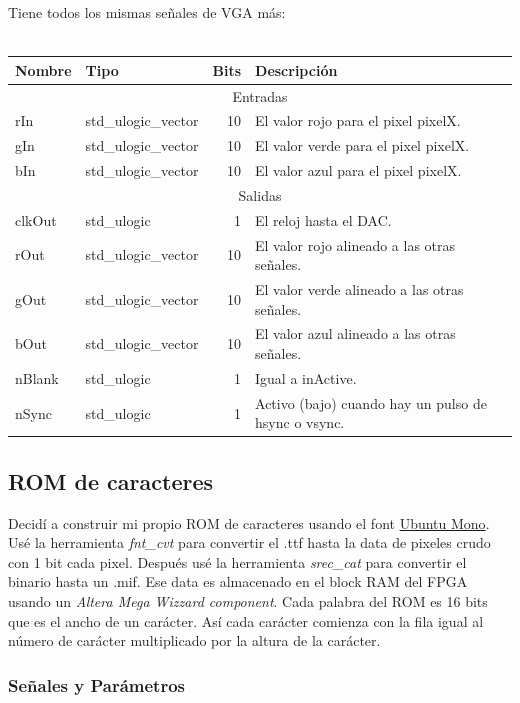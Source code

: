 \documentclass[a4paper]{article}
\begin{document}
Tiene todos los mismas señales de VGA más:\\ \\
\begin{tabular}{| l | l | r | p{8cm} |}
\hline
\textbf{Nombre} & \textbf{Tipo} & \textbf{Bits} & \textbf{Descripción} \\ \hline
\multicolumn{4}{|c|}{Entradas} \\ \hline
rIn & std\_ulogic\_vector & 10 & El valor rojo para el pixel pixelX. \\ 
gIn & std\_ulogic\_vector & 10 & El valor verde para el pixel pixelX. \\ 
bIn & std\_ulogic\_vector & 10 & El valor azul para el pixel pixelX. \\ 
\hline
\multicolumn{4}{|c|}{Salidas} \\ \hline
clkOut & std\_ulogic & 1 & El reloj hasta el DAC. \\
rOut & std\_ulogic\_vector & 10 & El valor rojo alineado a las otras señales. \\ 
gOut & std\_ulogic\_vector & 10 & El valor verde alineado a las otras señales. \\ 
bOut & std\_ulogic\_vector & 10 & El valor azul alineado a las otras señales. \\ 
nBlank & std\_ulogic & 1 & Igual a inActive. \\
nSync & std\_ulogic & 1 & Activo (bajo) cuando hay un pulso de hsync o vsync. \\ \hline
\end{tabular}

\subsection{ROM de caracteres}

Decidí a construir mi propio ROM de caracteres usando el font \href{https://www.fontsquirrel.com/fonts/ubuntu-mono}{Ubuntu Mono}. Usé la herramienta \textit{fnt\_cvt} para convertir el .ttf hasta la data de pixeles crudo con 1 bit cada pixel. Después usé la herramienta \textit{srec\_cat} para convertir el binario hasta un .mif. Ese data es almacenado en el block RAM del FPGA usando un \textit{Altera Mega Wizzard component}. Cada palabra del ROM es 16 bits que es el ancho de un carácter. Así cada carácter comienza con la fila igual al número de carácter multiplicado por la altura de la carácter.

\subsubsection{Señales y Parámetros}
\end{document}
